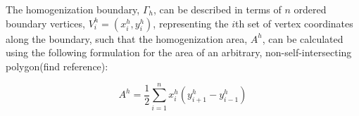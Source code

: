 
The homogenization boundary, $\Gamma_{h}$, can be described in terms of $n$ ordered boundary vertices, $V_{i}^{h}=(x_{i}^{h},y_{i}^{h})$, representing the $i$th set of vertex coordinates along the boundary, such that the homogenization area, $A^{h}$, can be calculated using the following formulation for the area of an arbitrary, non-self-intersecting polygon(find reference): 

\begin{equation}
A^{h}=\dfrac{1}{2}\sum_{i=1}^{n}x_{i}^{h}(y_{i+1}^{h}-y_{i-1}^{h})
\label{eqn:hom1}
\end{equation}





